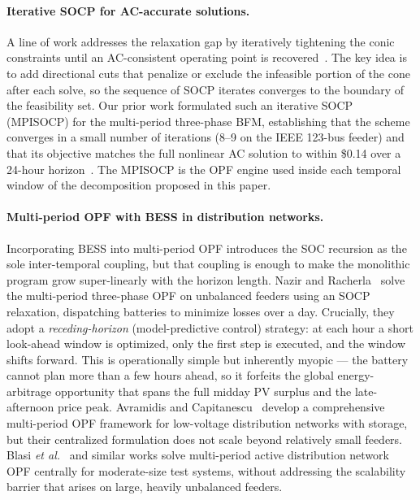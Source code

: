 \paragraph{Iterative SOCP for AC-accurate solutions.}
A line of work addresses the relaxation gap by iteratively tightening the conic
constraints until an AC-consistent operating point is
recovered~\cite{NiGr16,BoBu19}. The key idea is to add directional cuts that
penalize or exclude the infeasible portion of the cone after each solve, so the
sequence of SOCP iterates converges to the boundary of the feasibility set.
Our prior work formulated such an iterative SOCP (MPISOCP) for the multi-period
three-phase BFM, establishing that the scheme converges in a small number of
iterations (8--9 on the IEEE 123-bus feeder) and that its objective matches the
full nonlinear AC solution to within \$0.14 over a 24-hour
horizon~\cite{OurISCOPRef}. The MPISOCP is the OPF engine used inside each
temporal window of the decomposition proposed in this paper.

\paragraph{Multi-period OPF with BESS in distribution networks.}
Incorporating BESS into multi-period OPF introduces the SOC recursion as the
sole inter-temporal coupling, but that coupling is enough to make the monolithic
program grow super-linearly with the horizon length. Nazir and
Racherla~\cite{NaRa20} solve the multi-period three-phase OPF on unbalanced
feeders using an SOCP relaxation, dispatching batteries to minimize losses
over a day. Crucially, they adopt a \emph{receding-horizon} (model-predictive
control) strategy: at each hour a short look-ahead window is optimized, only
the first step is executed, and the window shifts forward. This is operationally
simple but inherently myopic — the battery cannot plan more than a few hours
ahead, so it forfeits the global energy-arbitrage opportunity that spans the
full midday PV surplus and the late-afternoon price peak. Avramidis and
Capitanescu~\cite{AvCa20} develop a comprehensive multi-period OPF framework for
low-voltage distribution networks with storage, but their centralized formulation
does not scale beyond relatively small feeders.
Blasi \textit{et al.}~\cite{BlFe22} and similar works solve multi-period active
distribution network OPF centrally for moderate-size test systems, without
addressing the scalability barrier that arises on large, heavily unbalanced
feeders.

